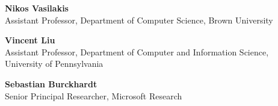 \documentclass[margin]{res}
\begin{document}
\begin{resume}
\textbf{Nikos Vasilakis}\\
Assistant Professor, Department of Computer Science, Brown University

\textbf{Vincent Liu}\\
Assistant Professor, Department of Computer and Information Science, University of Pennsylvania

\textbf{Sebastian Burckhardt}\\
Senior Principal Researcher, Microsoft Research





\end{resume}
\end{document}
